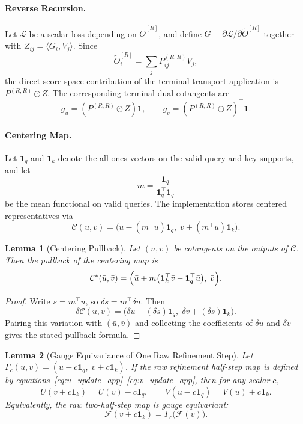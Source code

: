 \documentclass{article}
\newtheorem{lemma}{Lemma}
\begin{document}
\paragraph{Reverse Recursion.}
Let $\mathcal{L}$ be a scalar loss depending on $\widetilde{O}^{[R]}$, and define $G = \partial \mathcal{L} / \partial \widetilde{O}^{[R]}$ together with $Z_{ij} = \langle G_i, V_j \rangle$. Since
\[
\widetilde{O}^{[R]}_i = \sum_j P^{(R,R)}_{ij} V_j,
\]
the direct score-space contribution of the terminal transport application is $P^{(R,R)} \odot Z$. The corresponding terminal dual cotangents are
\[
g_u = (P^{(R,R)} \odot Z)\mathbf{1},
\qquad
g_v = (P^{(R,R)} \odot Z)^\top \mathbf{1}.
\]

\paragraph{Centering Map.}
Let $\mathbf{1}_q$ and $\mathbf{1}_k$ denote the all-ones vectors on the valid query and key supports, and let
\[
m = \frac{\mathbf{1}_q}{\mathbf{1}_q^\top \mathbf{1}_q}
\]
be the mean functional on valid queries. The implementation stores centered representatives via
\[
\mathcal{C}(u,v) = \bigl(u - (m^\top u)\mathbf{1}_q,\; v + (m^\top u)\mathbf{1}_k\bigr).
\]

\begin{lemma}[Centering Pullback]\label{lem:centering_pullback}
Let $(\bar u, \bar v)$ be cotangents on the outputs of $\mathcal{C}$. Then the pullback of the centering map is
\[
\mathcal{C}^*(\bar u, \bar v)
=
\Bigl(
\bar u + m\bigl(\mathbf{1}_k^\top \bar v - \mathbf{1}_q^\top \bar u\bigr),
\;
\bar v
\Bigr).
\]
\end{lemma}

\begin{proof}
Write $s = m^\top u$, so $\delta s = m^\top \delta u$. Then
\[
\delta \mathcal{C}(u,v)
=
\bigl(\delta u - (\delta s)\mathbf{1}_q,\; \delta v + (\delta s)\mathbf{1}_k\bigr).
\]
Pairing this variation with $(\bar u,\bar v)$ and collecting the coefficients of $\delta u$ and $\delta v$ gives the stated pullback formula.
\end{proof}

\begin{lemma}[Gauge Equivariance of One Raw Refinement Step]\label{lem:gauge_equivariance}
Let $\Gamma_c(u,v) = (u-c\mathbf{1}_q,\; v+c\mathbf{1}_k)$. If the raw refinement half-step map is defined by equations~\eqref{eq:u_update_app}--\eqref{eq:v_update_app}, then for any scalar $c$,
\[
U(v+c\mathbf{1}_k) = U(v) - c\mathbf{1}_q,
\qquad
V(u-c\mathbf{1}_q) = V(u) + c\mathbf{1}_k.
\]
Equivalently, the raw two-half-step map is gauge equivariant:
\[
\mathcal{F}(v+c\mathbf{1}_k) = \Gamma_c\bigl(\mathcal{F}(v)\bigr).
\]
\end{lemma}
\end{document}
